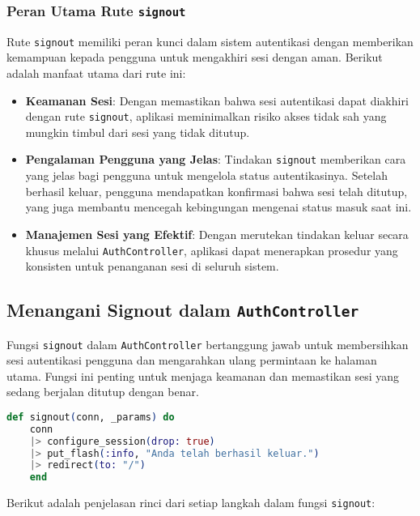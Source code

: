 \subsubsection{Peran Utama Rute \texttt{signout}}
Rute \texttt{signout} memiliki peran kunci dalam sistem autentikasi dengan memberikan kemampuan kepada pengguna untuk mengakhiri sesi dengan aman. Berikut adalah manfaat utama dari rute ini:
\begin{itemize}
	\item \textbf{Keamanan Sesi}: Dengan memastikan bahwa sesi autentikasi dapat diakhiri dengan rute \texttt{signout}, aplikasi meminimalkan risiko akses tidak sah yang mungkin timbul dari sesi yang tidak ditutup.
	\item \textbf{Pengalaman Pengguna yang Jelas}: Tindakan \texttt{signout} memberikan cara yang jelas bagi pengguna untuk mengelola status autentikasinya. Setelah berhasil keluar, pengguna mendapatkan konfirmasi bahwa sesi telah ditutup, yang juga membantu mencegah kebingungan mengenai status masuk saat ini.
	\item \textbf{Manajemen Sesi yang Efektif}: Dengan merutekan tindakan keluar secara khusus melalui \texttt{AuthController}, aplikasi dapat menerapkan prosedur yang konsisten untuk penanganan sesi di seluruh sistem.
\end{itemize}


\subsection{Menangani Signout dalam \texttt{AuthController}}
Fungsi \texttt{signout} dalam \texttt{AuthController} bertanggung jawab untuk membersihkan sesi autentikasi pengguna dan mengarahkan ulang permintaan ke halaman utama. Fungsi ini penting untuk menjaga keamanan dan memastikan sesi yang sedang berjalan ditutup dengan benar.

\begin{lstlisting}[language=Elixir, caption={\texttt{lib/hello\_web/controllers/auth\_controller.ex}}]
	def signout(conn, _params) do
	conn
	|> configure_session(drop: true)
	|> put_flash(:info, "Anda telah berhasil keluar.")
	|> redirect(to: "/")
	end
\end{lstlisting}

Berikut adalah penjelasan rinci dari setiap langkah dalam fungsi \texttt{signout}:

